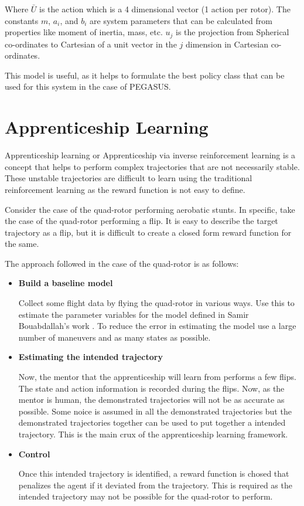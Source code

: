 \documentclass[hidelinks,BTech]{iitmdiss}
\begin{document}
Where $\bar{U}$ is the action which is a 4 dimensional vector (1 action per rotor). The constants $m$, $a_{i}$, and $b_{i}$ are system parameters that can be calculated from properties like moment of inertia, mass, etc. $u_{j}$ is the projection from Spherical co-ordinates to Cartesian of a unit vector in the $j$ dimension in Cartesian co-ordinates.

This model is useful, as it helps to formulate the best policy class that can be used for this system in the case of PEGASUS.

\chapter{Apprenticeship Learning}

Apprenticeship learning or Apprenticeship via inverse reinforcement learning \cite{ApprenticeshipLearning} is a concept that helps to perform complex trajectories that are not necessarily stable. These unstable trajectories are difficult to learn using the traditional reinforcement learning as the reward function is not easy to define.

Consider the case of the quad-rotor performing aerobatic stunts. In specific, take the case of the quad-rotor performing a flip. It is easy to describe the target trajectory as a flip, but it is difficult to create a closed form reward function for the same.

The approach followed in the case of the quad-rotor is as follows:

\begin{itemize}
\item{{\bf Build a baseline model}

Collect some flight data by flying the quad-rotor in various ways. Use this to estimate the parameter variables for the model defined in Samir Bouabdallah's work \cite{QuadrotorDynamics}. To reduce the error in estimating the model use a large number of maneuvers and as many states as possible.}

\item{{\bf Estimating the intended trajectory}

Now, the mentor that the apprenticeship will learn from performs a few flips. The state and action information is recorded during the flips. Now, as the mentor is human, the demonstrated trajectories will not be as accurate as possible. Some noice is assumed in all the demonstrated trajectories but the demonstrated trajectories together can be used to put together a intended trajectory. This is the main crux of the apprenticeship learning framework.}

\item{{\bf Control}

Once this intended trajectory is identified, a reward function is chosed that penalizes the agent if it deviated from the trajectory. This is required as the intended trajectory may not be possible for the quad-rotor to perform.}

\end{itemize}
\end{document}
